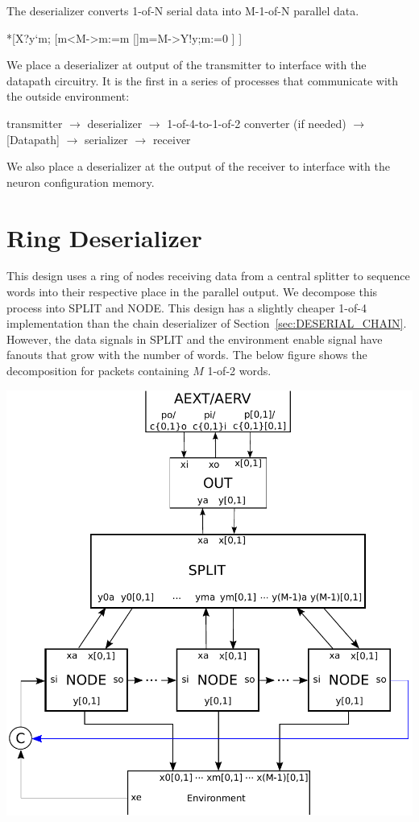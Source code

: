 \documentclass{article}
\begin{document}
The deserializer converts 1-of-N serial data into M-1-of-N parallel data.

\begin{csp}
*[X?y`m;
    [m<M->m:=m
    []m=M->Y!y;m:=0
    ]
 ]
\end{csp}

We place a deserializer at output of the transmitter to interface with the 
datapath circuitry. It is the first in a series of processes that communicate 
with the outside environment:

\noindent
transmitter $\rightarrow$
deserializer $\rightarrow$
1-of-4-to-1-of-2 converter (if needed) $\rightarrow$
[Datapath] $\rightarrow$
serializer $\rightarrow$
receiver

\noindent
We also place a deserializer at the output of the receiver to interface with the
neuron configuration memory.

\section{Ring Deserializer \label{sec:DESERIAL_RING}}

This design uses a ring of nodes receiving data from a central splitter 
to sequence words into their respective place in the parallel output. 
We decompose this process into SPLIT and NODE. 
This design has a slightly cheaper 1-of-4 implementation than the 
chain deserializer of Section~\ref{sec:DESERIAL_CHAIN}. 
However, the data signals in SPLIT and the environment enable signal have 
fanouts that grow with the number of words.
The below figure shows the decomposition for packets containing $M$ 1-of-2 words.

\begin{center}
  \includegraphics[width=.45\textwidth]{img/deserial_ring.pdf}
\end{center}
\end{document}
